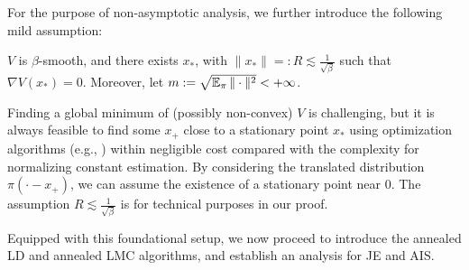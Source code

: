 For the purpose of non-asymptotic analysis, we further introduce the following mild assumption:
\begin{assumption}
    $V$ is $\beta$-smooth, and there exists $x_*$, with $\|x_*\|=:R\lesssim\frac{1}{\sqrt{\beta}}$ such that $\nabla V(x_*)=0$. Moreover, let $m:=\sqrt{\operatorname{\mathbb{E}}_\pi\|\cdot\|^2}<{+\infty}$.
    \label{assu:pi}
\end{assumption}
\begin{remark}
    Finding a global minimum of (possibly non-convex) $V$ is challenging, but it is always feasible to find some $x_+$ close to a stationary point $x_*$ using optimization algorithms (e.g., \cite{zhu2018neon2}) within negligible cost compared with the complexity for normalizing constant estimation. By considering the translated distribution $\pi(\cdot-x_+)$, we can assume the existence of a stationary point near $0$. The assumption $R\lesssim\frac{1}{\sqrt{\beta}}$ is for technical purposes in our proof.
\end{remark}

Equipped with this foundational setup, we now proceed to introduce the annealed LD and annealed LMC algorithms, and establish an analysis for JE and AIS.